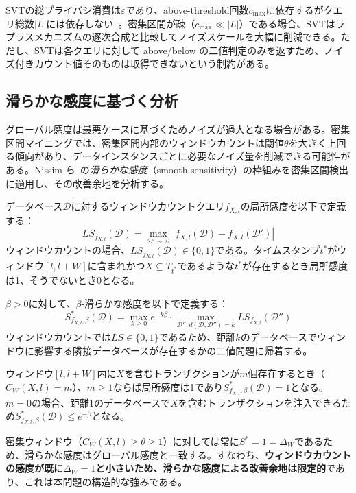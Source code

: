 SVTの総プライバシ消費は$\varepsilon$であり、above-threshold回数$c_\text{max}$に依存するがクエリ総数$|L|$には依存しない~\cite{lyu2017understanding}。密集区間が疎（$c_\text{max} \ll |L|$）である場合、SVTはラプラスメカニズムの逐次合成と比較してノイズスケールを大幅に削減できる。ただし、SVTは各クエリに対して above/below の二値判定のみを返すため、ノイズ付きカウント値そのものは取得できないという制約がある。

\subsection{滑らかな感度に基づく分析}\label{subsec:smooth-sensitivity}

グローバル感度は最悪ケースに基づくためノイズが過大となる場合がある。密集区間マイニングでは、密集区間内部のウィンドウカウントは閾値$\theta$を大きく上回る傾向があり、データインスタンスごとに必要なノイズ量を削減できる可能性がある。Nissim ら~\cite{nissim2007smooth}の\emph{滑らかな感度}（smooth sensitivity）の枠組みを密集区間検出に適用し、その改善余地を分析する。

\begin{definition}[ウィンドウカウントの局所感度]\label{def:local-sensitivity}
データベース$\mathcal{D}$に対するウィンドウカウントクエリ$f_{X,l}$の局所感度を以下で定義する：
\[
LS_{f_{X,l}}(\mathcal{D}) = \max_{\mathcal{D}' \sim \mathcal{D}} |f_{X,l}(\mathcal{D}) - f_{X,l}(\mathcal{D}')|
\]
ウィンドウカウントの場合、$LS_{f_{X,l}}(\mathcal{D}) \in \{0, 1\}$である。タイムスタンプ$t^*$がウィンドウ$[l, l+W]$に含まれかつ$X \subseteq T_{t^*}$であるような$t^*$が存在するとき局所感度は1、そうでないとき0となる。
\end{definition}

\begin{definition}\label{def:smooth-sensitivity-dim}
$\beta > 0$に対して、$\beta$-滑らかな感度を以下で定義する：
\[
S^*_{f_{X,l},\beta}(\mathcal{D}) = \max_{k \geq 0} e^{-k\beta} \cdot \max_{\mathcal{D}'': d(\mathcal{D}, \mathcal{D}'') = k} LS_{f_{X,l}}(\mathcal{D}'')
\]
ウィンドウカウントでは$LS \in \{0, 1\}$であるため、距離$k$のデータベースでウィンドウに影響する隣接データベースが存在するかの二値問題に帰着する。
\end{definition}

\begin{property}[密集ウィンドウの滑らかな感度の特徴]\label{prop:smooth-char}
ウィンドウ$[l, l+W]$内に$X$を含むトランザクションが$m$個存在するとき（$C_W(X,l) = m$）、$m \geq 1$ならば局所感度は1であり$S^*_{f_{X,l},\beta}(\mathcal{D}) = 1$となる。$m = 0$の場合、距離1のデータベースで$X$を含むトランザクションを注入できるため$S^*_{f_{X,l},\beta}(\mathcal{D}) \leq e^{-\beta}$となる。

密集ウィンドウ（$C_W(X,l) \geq \theta \geq 1$）に対しては常に$S^* = 1 = \Delta_W$であるため、滑らかな感度はグローバル感度と一致する。すなわち、\textbf{ウィンドウカウントの感度が既に$\Delta_W = 1$と小さいため、滑らかな感度による改善余地は限定的}であり、これは本問題の構造的な強みである。
\end{property}

